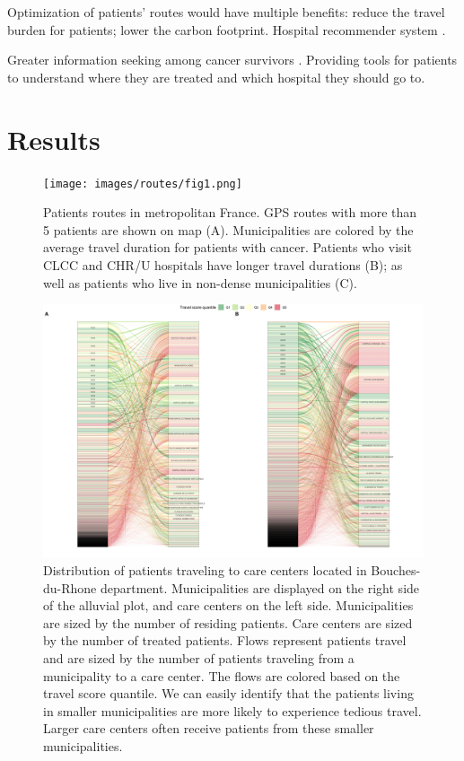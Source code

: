 Optimization of patients' routes would have multiple benefits: reduce the travel burden for patients; lower the carbon footprint.
Hospital recommender system \cite{zhang_idoctor_2017,han_hybrid_2018,narducci_recommender_2015,hoens_reliable_2010,tran_recommender_2021}.

Greater information seeking among cancer survivors \cite{finney_rutten_cancer-related_2016}. Providing tools for patients to understand where they are treated and which hospital they should go to.

\section{Results}

\begin{figure}[h]
    \texttt{[image: images/routes/fig1.png]}
    \centering
    \caption{
        Patients routes in metropolitan France. GPS routes with more than 5 patients are shown on map (A). Municipalities are colored by the average travel duration for patients with cancer. Patients who visit CLCC and CHR/U hospitals have longer travel durations (B); as well as patients who live in non-dense municipalities (C).
    }
    \label{fig:routes-duration-france}
\end{figure}

\begin{figure}[h]
    \includegraphics[width=\textwidth]{images/routes/fig6.png}
    \centering
    \caption{
        Distribution of patients traveling to care centers located in Bouches-du-Rhone department. Municipalities are displayed on the right side of the alluvial plot, and care centers on the left side. Municipalities are sized by the number of residing patients. Care centers are sized by the number of treated patients. Flows represent patients travel and are sized by the number of patients traveling from a municipality to a care center. The flows are colored based on the travel score quantile. We can easily identify that the patients living in smaller municipalities are more likely to experience tedious travel. Larger care centers often receive patients from these smaller municipalities.
    }
    \label{fig:routes-alluvial-13}
\end{figure}

